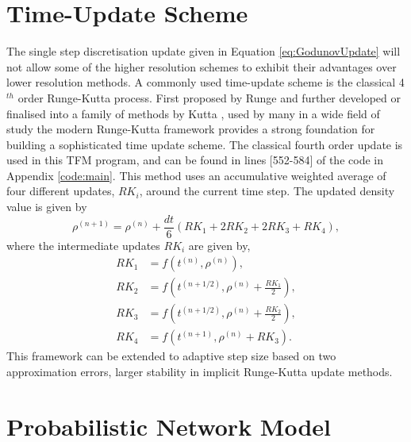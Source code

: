 \section{Time-Update Scheme}
\label{sec:timeupdatescheme}

	The single step discretisation update given in Equation \ref{eq:GodunovUpdate} will not allow some of the higher resolution schemes to exhibit their advantages over lower resolution methods. A commonly used time-update scheme is the classical 4$^{th}$ order Runge-Kutta process. First proposed by Runge \cite{Runge1895} and further developed or finalised into a family of methods by Kutta \cite{Kutta1901}, used by many in a wide field of study the modern Runge-Kutta framework provides a strong foundation for building a sophisticated time update scheme. The classical fourth order update is used in this TFM program, and can be found in lines [552-584] of the code in Appendix \ref{code:main}. This method uses an accumulative weighted average of four different updates, $RK_i$,  around the current time step. The updated density value is given by
	\begin{equation}
		\rho^{(n+1)}=\rho^{(n)}+\frac{dt}{6}\left(RK_1+2RK_2+2RK_3+RK_4\right),
	\end{equation}
	where the intermediate updates $RK_i$ are given by,
	\begin{align}
		RK_1&=f\left(t^{(n)},\rho^{(n)}\right),\\
		RK_2&=f\left(t^{(n+1/2)},\rho^{(n)}+\frac{RK_1}{2}\right),\\
		RK_3&=f\left(t^{(n+1/2)},\rho^{(n)}+\frac{RK_2}{2}\right),\\
		RK_4&=f\left(t^{(n+1)},\rho^{(n)}+RK_3\right).
	\end{align}
	This framework can be extended to adaptive step size based on two approximation errors, larger stability in implicit Runge-Kutta update methods.

\section{Probabilistic Network Model}
\label{sec:networkmodel}


